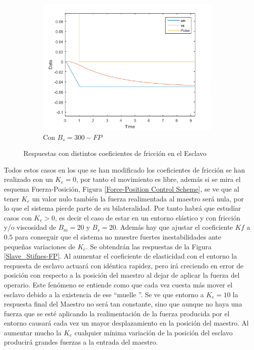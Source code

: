 \documentclass[a4paper, fontsize=11pt]{scrartcl} %
\numberwithin{equation}{section} %
\numberwithin{figure}{section} %
\numberwithin{table}{section} %
\begin{document}
\begin{figure}[h!]
\begin{subfigure}[t]{.5\textwidth}
			\includegraphics[width=1\linewidth]{images/Bs300-FP.PNG}
			\caption{Con $B_s = 300-FP$}
			\label{Bs300-FP}
		\end{subfigure}
		\caption{Respuestas con distintos coeficientes de fricción en el Esclavo}
		\label{Slave_Friction-FP}
	\end{figure}
	\FloatBarrier
	
	Todos estos casos en los que se han modificado los coeficientes de fricción se han realizado con un $K_e = 0$, por tanto el movimiento es libre, además si se mira el esquema Fuerza-Posición, Figura \ref{Force-Position Control Scheme}, se ve que al tener $K_e$ un valor nulo también la fuerza realimentada al maestro será nula, por lo que el sistema pierde parte de su bilateralidad. Por tanto habrá que estudiar casos con $K_e > 0$, es decir el caso de estar en un entorno elástico y con fricción y/o viscosidad de $B_m = 20$ y $B_s = 20$. Además hay que ajustar el coeficiente $Kf$ a $0.5$ para conseguir que el sistema no muestre fuertes inestabilidades ante pequeñas variaciones de $K_e$. Se obtendrán las respuestas de la Figura \ref{Slave_Stifnes-FP}. Al aumentar el coeficiente de elasticidad con el entorno la respuesta de esclavo actuará con idéntica rapidez, pero irá creciendo en error de posición con respecto a la posición del maestro al dejar de aplicar la fuerza del operario. Este fenómeno se entiende como que cada vez cuesta más mover el esclavo debido a la existencia de ese \textquotedblleft muelle \textquotedblright. Se ve que entorno a $K_e = 10$ la respuesta final del Maestro no será tan constante, sino que aunque no haya una fuerza que se esté aplicando la realimentación de la fuerza producida por el entorno causará cada vez un mayor desplazamiento en la posición del maestro. Al aumentar mucho la $K_e$ cualquier mínima variación de la posición del esclavo producirá grandes fuerzas a la entrada del maestro.
	
\end{document}
